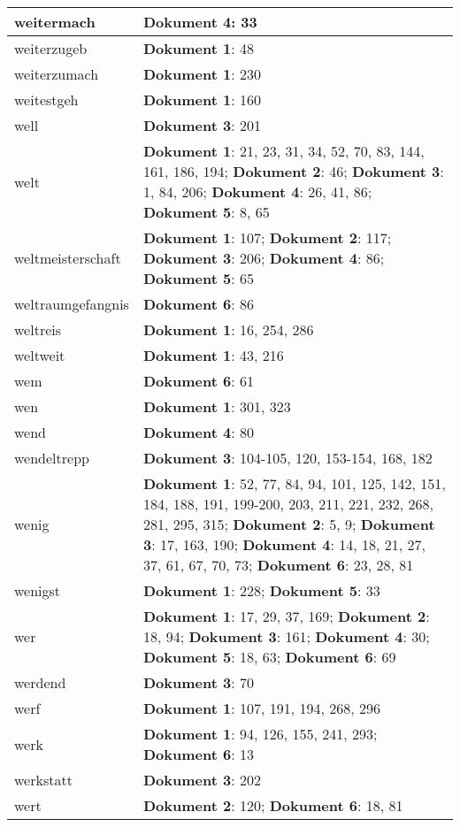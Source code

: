 \documentclass[a5paper]{article}
\begin{document}
\begin{longtable}[l]{|l|p{3in}|}
\hline
weitermach & \textbf{Dokument 4}: 33 \\
\hline
weiterzugeb & \textbf{Dokument 1}: 48 \\
\hline
weiterzumach & \textbf{Dokument 1}: 230 \\
\hline
weitestgeh & \textbf{Dokument 1}: 160 \\
\hline
well & \textbf{Dokument 3}: 201 \\
\hline
welt & \textbf{Dokument 1}: 21, 23, 31, 34, 52, 70, 83, 144, 161, 186, 194; \textbf{Dokument 2}: 46; \textbf{Dokument 3}: 1, 84, 206; \textbf{Dokument 4}: 26, 41, 86; \textbf{Dokument 5}: 8, 65 \\
\hline
weltmeisterschaft & \textbf{Dokument 1}: 107; \textbf{Dokument 2}: 117; \textbf{Dokument 3}: 206; \textbf{Dokument 4}: 86; \textbf{Dokument 5}: 65 \\
\hline
weltraumgefangnis & \textbf{Dokument 6}: 86 \\
\hline
weltreis & \textbf{Dokument 1}: 16, 254, 286 \\
\hline
weltweit & \textbf{Dokument 1}: 43, 216 \\
\hline
wem & \textbf{Dokument 6}: 61 \\
\hline
wen & \textbf{Dokument 1}: 301, 323 \\
\hline
wend & \textbf{Dokument 4}: 80 \\
\hline
wendeltrepp & \textbf{Dokument 3}: 104-105, 120, 153-154, 168, 182 \\
\hline
wenig & \textbf{Dokument 1}: 52, 77, 84, 94, 101, 125, 142, 151, 184, 188, 191, 199-200, 203, 211, 221, 232, 268, 281, 295, 315; \textbf{Dokument 2}: 5, 9; \textbf{Dokument 3}: 17, 163, 190; \textbf{Dokument 4}: 14, 18, 21, 27, 37, 61, 67, 70, 73; \textbf{Dokument 6}: 23, 28, 81 \\
\hline
wenigst & \textbf{Dokument 1}: 228; \textbf{Dokument 5}: 33 \\
\hline
wer & \textbf{Dokument 1}: 17, 29, 37, 169; \textbf{Dokument 2}: 18, 94; \textbf{Dokument 3}: 161; \textbf{Dokument 4}: 30; \textbf{Dokument 5}: 18, 63; \textbf{Dokument 6}: 69 \\
\hline
werdend & \textbf{Dokument 3}: 70 \\
\hline
werf & \textbf{Dokument 1}: 107, 191, 194, 268, 296 \\
\hline
werk & \textbf{Dokument 1}: 94, 126, 155, 241, 293; \textbf{Dokument 6}: 13 \\
\hline
werkstatt & \textbf{Dokument 3}: 202 \\
\hline
wert & \textbf{Dokument 2}: 120; \textbf{Dokument 6}: 18, 81 \\

\end{longtable}
\end{document}
